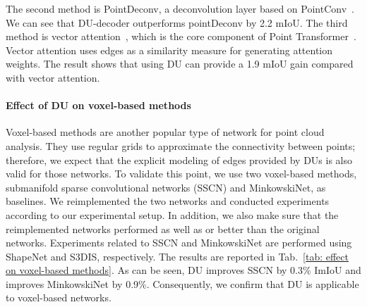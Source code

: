 \documentclass[a4paper,fleqn]{cas-dc}
\begin{document}
The second method is PointDeconv, a deconvolution layer based on PointConv~\cite{wu2019pointconv}. We can see that DU-decoder outperforms pointDeconv by 2.2 mIoU. 
The third method is vector attention~\cite{zhao2021point}, which is the core component of Point Transformer~\cite{zhao2021point}. Vector attention uses edges as a similarity measure for generating attention weights. The result shows that using DU can provide a 1.9 mIoU gain compared with vector attention.  






















































\paragraph{Effect of DU on voxel-based methods}
Voxel-based methods are another popular type of network for point cloud analysis. They use regular grids to approximate the connectivity between points; therefore, we expect that the explicit modeling of edges provided by DUs is also valid for those networks. To validate this point, we use two voxel-based methods, submanifold sparse convolutional networks (SSCN) and MinkowskiNet, as baselines. We reimplemented the two networks and conducted experiments according to our experimental setup. In addition, we also make sure that the reimplemented networks performed as well as or better than the original networks. Experiments related to SSCN and MinkowskiNet are performed using ShapeNet and S3DIS, respectively. The results are reported in Tab.~\ref{tab: effect on voxel-based methods}. 
As can be seen, DU improves SSCN by 0.3\% ImIoU and improves MinkowskiNet by 0.9\%. Consequently, we confirm that DU is applicable to voxel-based networks.
\end{document}
